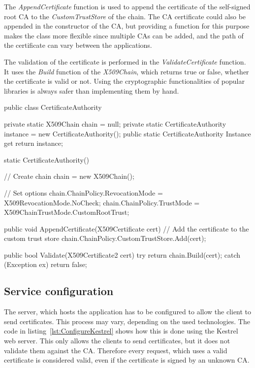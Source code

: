 The \textit{AppendCertificate} function is used to append the certificate of the self-signed root CA to the \textit{CustomTrustStore} of the chain.
The CA certificate could also be appended in the constructor of the CA, but providing a function for this purpose makes the class more flexible since multiple CAs can be added, and the path of the certificate can vary between the applications.

The validation of the certificate is performed in the \textit{ValidateCertificate} function. 
It uses the \textit{Build} function of the \textit{X509Chain}, which returns true or false, whether the certificate is valid or not.
Using the cryptographic functionalities of popular libraries is always safer than implementing them by hand.

\noindent \begin{minipage}{\linewidth}
\begin{CsCode}[label={lst:CertificateAuthority}, caption={CertificateAuthority class, that is responsible for the certificate validation~\cite{impsingleton,impvalidatecert,impx509chain}},captionpos=b]
 public class CertificateAuthority {
    private static X509Chain chain = null;
    private static CertificateAuthority instance = new CertificateAuthority();
    public static CertificateAuthority Instance { get { return instance; } }
    
    static CertificateAuthority() {
        // Create chain
        chain = new X509Chain();
        
        // Set options
        chain.ChainPolicy.RevocationMode = X509RevocationMode.NoCheck;
        chain.ChainPolicy.TrustMode = X509ChainTrustMode.CustomRootTrust;
    }
    
    public void AppendCertificate(X509Certificate cert) {
        // Add the certificate to the custom trust store
        chain.ChainPolicy.CustomTrustStore.Add(cert);
    }
    
    public bool Validate(X509Certificate2 cert) {
        try {
            return chain.Build(cert);
        } catch (Exception ex) {
            return false;
        }
    }
}
\end{CsCode}
\end{minipage}

\subsection{Service configuration}
The server, which hosts the application has to be configured to allow the client to send certificates. 
This process may vary, depending on the used technologies.
The code in listing~\ref{lst:ConfigureKestrel} shows how this is done using the Kestrel web server.
This only allows the clients to send certificates, but it does not validate them against the CA.
Therefore every request, which uses a valid certificate is considered valid, even if the certificate is signed by an unknown CA.

